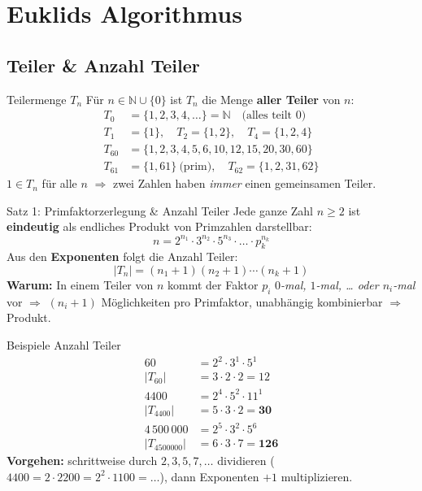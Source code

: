 \documentclass[a4paper, fontsize=7pt]{scrartcl}
\def\N{\mathbb{N}}  %
\begin{document}
\section{Euklids Algorithmus}

\subsection{Teiler \& Anzahl Teiler}

\begin{mainbox}{Teilermenge $T_n$}
Für $n \in \N \cup \{0\}$ ist $T_n$ die Menge \textbf{aller Teiler} von $n$:
\begin{align*}
T_0 &= \{1,2,3,4,\ldots\} = \N \quad\text{(alles teilt $0$)}\\
T_1 &= \{1\}, \quad T_2 = \{1,2\}, \quad T_4 = \{1,2,4\}\\
T_{60} &= \{1,2,3,4,5,6,10,12,15,20,30,60\}\\
T_{61} &= \{1,61\} \ \text{(prim)}, \quad T_{62} = \{1,2,31,62\}
\end{align*}
$1 \in T_n$ für alle $n$ $\Rightarrow$ zwei Zahlen haben \emph{immer} einen
gemeinsamen Teiler.
\end{mainbox}

\begin{mainbox}{Satz 1: Primfaktorzerlegung \& Anzahl Teiler}
Jede ganze Zahl $n \ge 2$ ist \textbf{eindeutig} als endliches Produkt von
Primzahlen darstellbar:
$$n = 2^{n_1} \cdot 3^{n_2} \cdot 5^{n_3} \cdot \ldots \cdot p_k^{n_k}$$
Aus den \textbf{Exponenten} folgt die Anzahl Teiler:
$$\boxed{|T_n| = (n_1+1)(n_2+1)\cdots(n_k+1)}$$
\textbf{Warum:} In einem Teiler von $n$ kommt der Faktor $p_i$
\emph{$0$-mal, $1$-mal, \ldots{} oder $n_i$-mal} vor $\Rightarrow$
$(n_i+1)$ Möglichkeiten pro Primfaktor, unabhängig kombinierbar
$\Rightarrow$ Produkt.
\end{mainbox}

\begin{subbox}{Beispiele Anzahl Teiler}
\begin{align*}
60 &= 2^2 \cdot 3^1 \cdot 5^1\\
|T_{60}| &= 3 \cdot 2 \cdot 2 = 12\\[2pt]
4400 &= 2^4 \cdot 5^2 \cdot 11^1\\
|T_{4400}| &= 5 \cdot 3 \cdot 2 = \mathbf{30}\\[2pt]
4\,500\,000 &= 2^5 \cdot 3^2 \cdot 5^6\\
|T_{4500000}| &= 6 \cdot 3 \cdot 7 = \mathbf{126}
\end{align*}
\textbf{Vorgehen:} schrittweise durch $2,3,5,7,\ldots$ dividieren
($4400 = 2\cdot 2200 = 2^2 \cdot 1100 = \ldots$), dann Exponenten
$+1$ multiplizieren.
\end{subbox}
\end{document}
